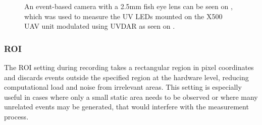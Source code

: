 \begin{figure}[H]
	\centering
	\caption{
  An event-based camera with a 2.5mm fish eye lens can be seen on , which was used to measure the UV LEDs mounted on the X500 UAV unit modulated using UVDAR as seen on .
  }
	\label{fig:uavcam}
\end{figure}

\subsubsection{ROI}
The \ac{ROI} setting during recording takes a rectangular region in pixel coordinates and discards events outside the specified region at the hardware level, reducing computational load and noise from irrelevant areas. This setting is especially useful in cases where only a small static area needs to be observed or where many unrelated events
may be generated, that would interfere with the measurement process.

